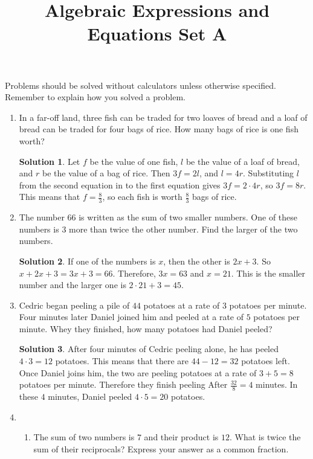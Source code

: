 \documentclass{article}
\title{Algebraic Expressions and Equations Set A}
\author{}
\date{}
\theoremstyle{definition}
\newtheorem*{solution}{Solution}
\begin{document}
    \maketitle
    \noindent Problems should be solved without calculators unless otherwise specified. Remember to explain how you solved a problem.
    \begin{enumerate}
        \item In a far-off land, three fish can be traded for two loaves of bread and a loaf of bread can be traded for four bags of rice. How many bags of rice is one fish worth?
        \begin{solution}
            Let $f$ be the value of one fish, $l$ be the value of a loaf of bread, and $r$ be the value of a bag of rice. Then $3f = 2l$, and $l = 4r$. Substituting $l$ from the second equation in to the first equation gives $3f = 2 \cdot 4r$, so $3f = 8r$. This means that $f = \frac{8}{3}$, so each fish is worth $\frac{8}{3}$ bags of rice.
        \end{solution}
        \item The number $66$ is written as the sum of two smaller numbers. One of these numbers is $3$ more than twice the other number. Find the larger of the two numbers.
        \begin{solution}
            If one of the numbers is $x$, then the other is $2x + 3$. So $x + 2x + 3 = 3x + 3 = 66$. Therefore, $3x = 63$ and $x = 21$. This is the smaller number and the larger one is $2 \cdot 21 + 3 = 45$.
        \end{solution}
        \item Cedric began peeling a pile of $44$ potatoes at a rate of $3$ potatoes per minute. Four minutes later Daniel joined him and peeled at a rate of $5$ potatoes per minute. Whey they finished, how many potatoes had Daniel peeled?
        \begin{solution}
            After four minutes of Cedric peeling alone, he has peeled $4 \cdot 3 = 12$ potatoes. This means that there are $44 - 12 = 32$ potatoes left. Once Daniel joins him, the two are peeling potatoes at a rate of $3 + 5 = 8$ potatoes per minute. Therefore they finish peeling After $\frac{32}{8} = 4$ minutes. In these $4$ minutes, Daniel peeled $4 \cdot 5 = 20$ potatoes.
        \end{solution}
        \item \begin{enumerate}
            \item The sum of two numbers is $7$ and their product is $12$. What is twice the sum of their reciprocals? Express your answer as a common fraction.

\end{enumerate}
\end{enumerate}
\end{document}
